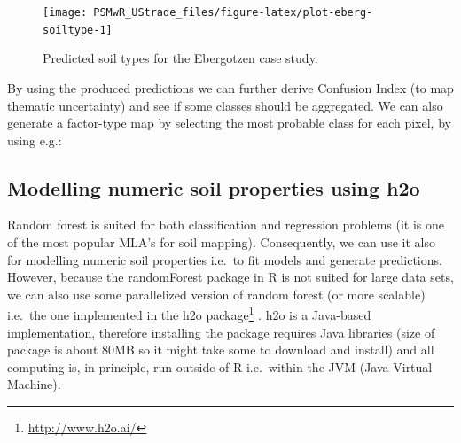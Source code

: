 \documentclass[graybox,natbib,nospthms,UStrade]{svmono}
\newenvironment{Shaded}{\begin{snugshade}}{\end{snugshade}}
\newcommand{\CommentTok}[1]{\textcolor[rgb]{0.37,0.37,0.37}{\textit{#1}}}
\newcommand{\DecValTok}[1]{\textcolor[rgb]{0.06,0.06,0.06}{#1}}
\newcommand{\KeywordTok}[1]{\textcolor[rgb]{0.27,0.27,0.27}{\textbf{#1}}}
\newcommand{\NormalTok}[1]{#1}
\newcommand{\OperatorTok}[1]{\textcolor[rgb]{0.43,0.43,0.43}{\textbf{#1}}}
\newcommand{\StringTok}[1]{\textcolor[rgb]{0.5,0.5,0.5}{#1}}
\renewcommand{\href}[2]{#2 (\url{#1})}
\renewcommand{\href}[2]{#2\footnote{\url{#1}}}
\begin{document}
\begin{figure}[H]

{\centering \texttt{[image: PSMwR\_UStrade\_files/figure-latex/plot-eberg-soiltype-1]} 

}

\caption{Predicted soil types for the Ebergotzen case study.}\label{fig:plot-eberg-soiltype}
\end{figure}

By using the produced predictions we can further derive Confusion Index (to map thematic uncertainty) and see if some classes should be aggregated. We can also generate a factor-type map by selecting the most probable class for each pixel, by using e.g.:

\begin{Shaded}
\end{Shaded}

\hypertarget{modelling-numeric-soil-properties-using-h2o}{%
\subsection{Modelling numeric soil properties using h2o}\label{modelling-numeric-soil-properties-using-h2o}}

Random forest is suited for both classification and regression problems (it is one of the most popular MLA's for soil mapping). Consequently, we can use it also for modelling numeric soil properties i.e.~to fit models and generate predictions. However, because the randomForest package in R is not suited for large data sets, we can also use some parallelized version of random forest (or more scalable) i.e.~the one implemented in the \href{http://www.h2o.ai/}{h2o package} \citep{richter2015multi}. h2o is a Java-based implementation, therefore installing the package requires Java libraries (size of package is about 80MB so it might take some to download and install) and all computing is, in principle, run outside of R i.e.~within the JVM (Java Virtual Machine).
\end{document}
